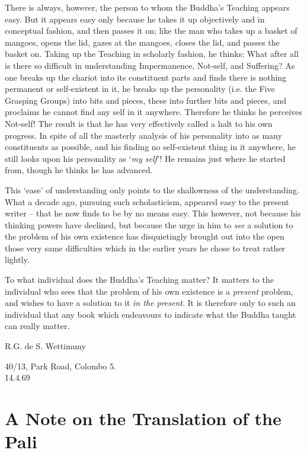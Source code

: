 There is always, however, the person to whom the Buddha's Teaching appears easy. But it appears easy only because he takes it up objectively and in conceptual fashion, and then passes it on; like the man who takes up a basket of mangoes, opens the lid, gazes at the mangoes, closes the lid, and passes the basket on. Taking up the Teaching in scholarly fashion, he thinks: What after all is there so difficult in understanding Impermanence, Not-self, and Suffering? As one breaks up the chariot into its constituent parts and finds there is nothing permanent or self-existent in it, he breaks up the personality (i.e. the Five Grasping Groups) into bits and pieces, these into further bits and pieces, and proclaims he cannot find any self in it anywhere. Therefore he thinks he perceives Not-self! The result is that he has very effectively called a halt to his own progress. In spite of all the masterly analysis of his personality into as many constituents as possible, and his finding no self-existent thing in it anywhere, he still looks upon his personality as `\emph{my self}'! He remains just where he started from, though he thinks he has advanced.

This `ease' of understanding only points to the shallowness of the understanding. What a decade ago, pursuing such scholasticism, appeared easy to the present writer -- that he now finds to be by no means easy. This however, not because his thinking powers have declined, but because the urge in him to \emph{see} a solution to the problem of his own existence has disquietingly brought out into the open those very same difficulties which in the earlier years he chose to treat rather lightly.

To what individual does the Buddha's Teaching matter? It matters to the individual who sees that the problem of his own existence is a \emph{present} problem, and wishes to have a solution to it \emph{in the present}. It is therefore only to such an individual that any book which endeavours to indicate what the Buddha taught can really matter.

R.G. de S. Wettimuny

40/13, Park Road, Colombo 5.\\
14.4.69

\hypertarget{_a_note_on_the_translation_of_the_pali}{%
\section{A Note on the Translation of the Pali}\label{_a_note_on_the_translation_of_the_pali}}

